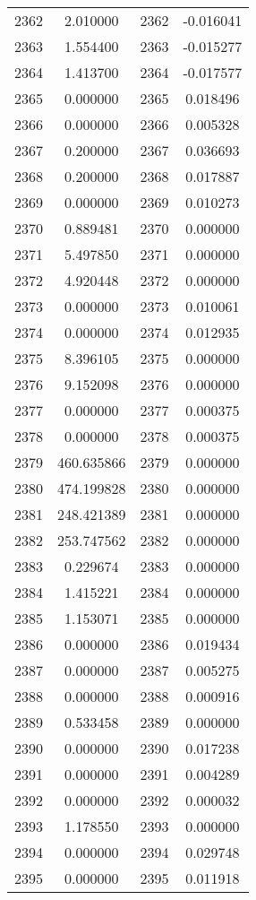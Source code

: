 \documentclass[12pt]{article}
\begin{document}
\begin{longtable}{@{}cccc@{}}
2362 & 2.010000 & 2362 & -0.016041 \\
2363 & 1.554400 & 2363 & -0.015277 \\
2364 & 1.413700 & 2364 & -0.017577 \\
2365 & 0.000000 & 2365 & 0.018496 \\
2366 & 0.000000 & 2366 & 0.005328 \\
2367 & 0.200000 & 2367 & 0.036693 \\
2368 & 0.200000 & 2368 & 0.017887 \\
2369 & 0.000000 & 2369 & 0.010273 \\
2370 & 0.889481 & 2370 & 0.000000 \\
2371 & 5.497850 & 2371 & 0.000000 \\
2372 & 4.920448 & 2372 & 0.000000 \\
2373 & 0.000000 & 2373 & 0.010061 \\
2374 & 0.000000 & 2374 & 0.012935 \\
2375 & 8.396105 & 2375 & 0.000000 \\
2376 & 9.152098 & 2376 & 0.000000 \\
2377 & 0.000000 & 2377 & 0.000375 \\
2378 & 0.000000 & 2378 & 0.000375 \\
2379 & 460.635866 & 2379 & 0.000000 \\
2380 & 474.199828 & 2380 & 0.000000 \\
2381 & 248.421389 & 2381 & 0.000000 \\
2382 & 253.747562 & 2382 & 0.000000 \\
2383 & 0.229674 & 2383 & 0.000000 \\
2384 & 1.415221 & 2384 & 0.000000 \\
2385 & 1.153071 & 2385 & 0.000000 \\
2386 & 0.000000 & 2386 & 0.019434 \\
2387 & 0.000000 & 2387 & 0.005275 \\
2388 & 0.000000 & 2388 & 0.000916 \\
2389 & 0.533458 & 2389 & 0.000000 \\
2390 & 0.000000 & 2390 & 0.017238 \\
2391 & 0.000000 & 2391 & 0.004289 \\
2392 & 0.000000 & 2392 & 0.000032 \\
2393 & 1.178550 & 2393 & 0.000000 \\
2394 & 0.000000 & 2394 & 0.029748 \\
2395 & 0.000000 & 2395 & 0.011918 \\

\end{longtable}
\end{document}
